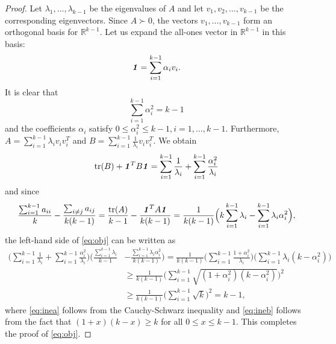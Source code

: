 \documentclass[11pt,onecolumn]{IEEEtran}
\def\mathbi#1{{\textbf{\textit #1}}}
\DeclareMathOperator{\tr}{tr}
\begin{document}
\begin{proof}
Let $\lambda_1,\dots,\lambda_{k-1}$ be the eigenvalues of $A$ and let $v_1,v_2,\dots,v_{k-1}$ be the corresponding eigenvectors. 
Since $A\succ 0$, the vectors $v_1,\dots,v_{k-1}$ form an orthogonal basis for $\mathbb{R}^{k-1}.$
Let us expand the all-ones vector in $\mathbb{R}^{k-1}$ in this basis:
   $$
\mathbi{1}=\sum_{i=1}^{k-1} \alpha_i v_i.
   $$
It is clear that
\begin{equation}\label{eq:alp}
\sum_{i=1}^{k-1} \alpha_i^2 = k-1
\end{equation}
and the coefficients $\alpha_i$ satisfy $0\le \alpha_i^2\le k-1, i=1,\dots, k-1.$
 Furthermore, $A=\sum_{i=1}^{k-1}\lambda_i v_i v_i^T$ and $B=\sum_{i=1}^{k-1}\frac{1}{\lambda_i} v_i v_i^T.$
We obtain
   $$
   \tr(B) + \mathbi{1}^T B \mathbi{1}=\sum_{i=1}^{k-1} \frac{1}{\lambda_i} + \sum_{i=1}^{k-1} \frac{\alpha_i^2}{\lambda_i}
   $$
and since
  $$
   \frac{\sum_{i=1}^{k-1}a_{ii}}{k}-\frac{\sum_{i\neq j}a_{ij} }{k(k-1)} =\frac{\tr(A)}{k-1}-\frac{\mathbi{1}^T A \mathbi{1} }{k(k-1)}
=\frac{1}{k(k-1)}\Big(k\sum_{i=1}^{k-1} \lambda_i - \sum_{i=1}^{k-1} \lambda_i\alpha_i^2 \Big),
  $$
the left-hand side of \eqref{eq:obj} can be written as
\begin{align}
 \Big( \sum_{i=1}^{k-1} \frac{1}{\lambda_i} + \sum_{i=1}^{k-1} \frac{\alpha_i^2}{\lambda_i} \Big)
\Big( \frac{\sum_{i=1}^{k-1}\lambda_i}{k-1}&-\frac{\sum_{i=1}^{k-1} \lambda_i\alpha_i^2 }{k(k-1)} \Big)
  = \frac{1}{k(k-1)} \Big( \sum_{i=1}^{k-1} \frac{1 + \alpha_i^2}{\lambda_i}  \Big)
\Big( \sum_{i=1}^{k-1}\lambda_i (k-\alpha_i^2) \Big) \nonumber \\
&\ge  \frac{1}{k(k-1)} \Big( \sum_{i=1}^{k-1} \sqrt{(1 + \alpha_i^2)(k-\alpha_i^2)} \Big)^2 \label{eq:inea} \\
&\ge  \frac{1}{k(k-1)} \Big( \sum_{i=1}^{k-1} \sqrt{k} \Big)^2 = k-1,  \label{eq:ineb}
\end{align}
where \eqref{eq:inea} follows from the Cauchy-Schwarz inequality and \eqref{eq:ineb} follows from the fact that $(1+x)(k-x)\ge k$ for all $0\le x\le k-1.$ 
This completes the proof of \eqref{eq:obj}.


\end{proof}
\end{document}
